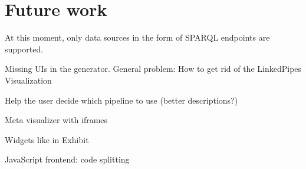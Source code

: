 \chapter{Future work}

At this moment, only data sources in the form of SPARQL endpoints are supported.

Missing UIs in the generator. General problem: How to get rid of the LinkedPipes Visualization

Help the user decide which pipeline to use (better descriptions?)

Meta visualizer with iframes

Widgets like in Exhibit

JavaScript frontend: code splitting